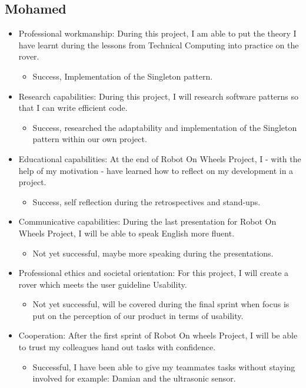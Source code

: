 \documentclass[12pt]{article}
\begin{document}
	\subsection{Mohamed}
	\begin{itemize}
		\item Professional workmanship: During this project, I am able to put the theory I have learnt during the lessons from Technical Computing into practice on the rover.
		\begin{itemize}
			\item Success, Implementation of the Singleton pattern.
		\end{itemize}
		\item Research capabilities: During this project, I will research software patterns so that I can write efficient code.
		\begin{itemize}
			\item Success, researched the adaptability and implementation of the Singleton pattern within our own project. 
		\end{itemize}
		\item Educational capabilities: At the end of Robot On Wheels Project, I - with the help of my motivation - have learned how to reflect on my development in a project.
		\begin{itemize}
			\item Success, self reflection during the retrospectives and stand-ups.
		\end{itemize}
		\item Communicative capabilities: During the last presentation for Robot On Wheels Project, I will be able to speak English more fluent.
		\begin{itemize}
			\item Not yet successful, maybe more speaking during the presentations.
		\end{itemize}
		\item Professional ethics and societal orientation: For this project, I will create a rover which meets the user guideline Usability.
		\begin{itemize}
			\item Not yet successful, will be covered during the final sprint when focus is put on the perception of our product in terms of usability.
		\end{itemize}
		\item Cooperation: After the first sprint of Robot On wheels Project, I will be able to trust my colleagues hand out tasks with confidence.
		\begin{itemize}
			\item Successful, I have been able to give my teammates tasks without staying involved for example: Damian and the ultrasonic sensor.
		\end{itemize}
	\end{itemize}
\end{document}
